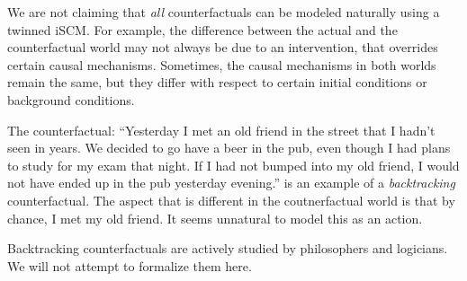 We are not claiming that \emph{all} counterfactuals can be modeled naturally using a twinned iSCM.
For example, the difference between the actual and the counterfactual world may not always be due to an intervention,
that overrides certain causal mechanisms. Sometimes, the causal mechanisms in both worlds remain the same, but they
differ with respect to certain initial conditions or background conditions.
  \begin{Eg}
    The counterfactual: ``Yesterday I met an old friend in the street that I hadn't seen in years. 
    We decided to go have a beer in the pub, even though I had plans to study for my exam that night. 
    If I had not bumped into my old friend, I would not have ended up in the pub yesterday evening.''
    is an example of a \emph{backtracking} counterfactual.
    The aspect that is different in the coutnerfactual world is that by chance, I met my old friend.
    It seems unnatural to model this as an action.
  \end{Eg}
Backtracking counterfactuals are actively studied by philosophers and logicians. 
We will not attempt to formalize them here.

